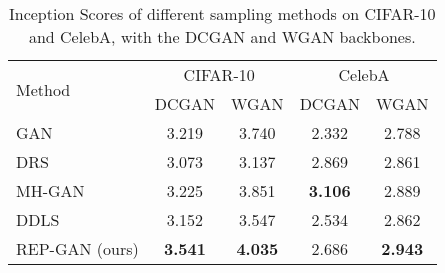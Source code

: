 \documentclass[runningheads]{llncs}
\newcommand{\<}{\left\langle}
\renewcommand{\>}{\right\rangle}
\begin{document}
\begin{table}[t]\centering
    \caption{Inception Scores of different sampling methods on CIFAR-10 and CelebA, with the DCGAN and WGAN backbones.}
    \label{tab:cifar-10-incep-results}
    \begin{tabular}{lcccc}
    \toprule
    \multirow{2}{*}{Method} &  \multicolumn{2}{c}{CIFAR-10} &  \multicolumn{2}{c}{CelebA} \\
    & DCGAN & WGAN & DCGAN & WGAN \\
    \midrule
    GAN  & 3.219 & 3.740  & 2.332 & 2.788 \\
    DRS \cite{azadi2019discriminator} & 3.073 & 3.137 & 2.869 & 2.861 \\
    MH-GAN \cite{turner2019metropolis}  & 3.225 & 3.851 & \textbf{3.106} & 2.889 \\
    DDLS \cite{che2020your} & 3.152 & 3.547 & 2.534 & 2.862 \\    
    REP-GAN (ours)  & \textbf{3.541} & \textbf{4.035} & 2.686 & \textbf{2.943} \\
    \bottomrule
    \end{tabular}
\end{table}


\end{document}
